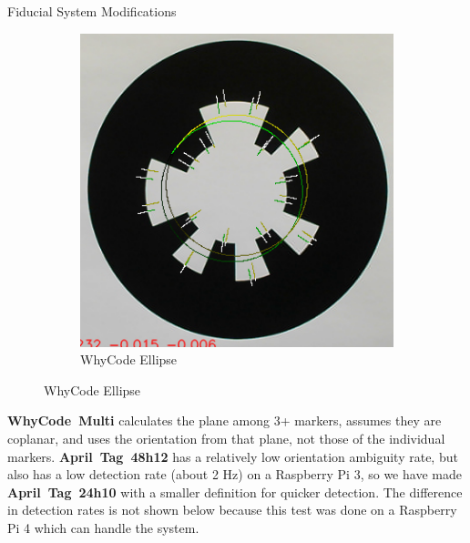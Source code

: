 \documentclass[final, 20pt]{beamer}
\newlength{\colwidth}
\begin{document}
\begin{frame}[t]
\begin{columns}[t]
\begin{column}{\colwidth}
\begin{block}{Fiducial System Modifications}
\begin{figure}[]
\begin{subfigure}[b]{0.3\linewidth}
            \includegraphics[width=\textwidth]{./images/whycode_ellipse_both_solutions_cropped}
            \caption{WhyCode Ellipse}
            \label{figure:whycode_ellipse}
        \end{subfigure}
    \end{figure}
    \vspace*{-1cm}
    \textbf{WhyCode~Multi} calculates the plane among 3+ markers, assumes they are coplanar, and uses the orientation
    from that plane, not those of the individual markers.
    \textbf{April~Tag~48h12} has a relatively low orientation ambiguity rate, but also has a low detection rate (about 2 Hz)
    on a Raspberry Pi 3, so we have made \textbf{April~Tag~24h10} with a smaller definition for quicker detection.
    The difference in detection rates is not shown below because this test was done on a Raspberry Pi 4 which can handle the system.
    \vspace*{-0.5cm}
    \begin{figure}[]
        \centering
        \begin{subfigure}[b]{0.49\linewidth}

\end{subfigure}
\end{figure}
\end{block}
\end{column}
\end{columns}
\end{frame}
\end{document}
